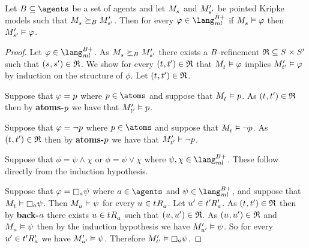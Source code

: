 \begin{proposition}\label{refinements-preserve-positive}
Let $\agentsB \subseteq \agents$ be a set of agents and let $\kPModel{\kStateS}$ and ${M^{\prime}_{{s}^{\prime}}}$ be pointed Kripke models such that $\kPModel{\kStateS} \simulatesBs \kPModelP{\kStateSP}$.
Then for every $\phi \in \langMlPlusBs$
if $\kPModel{\kStateS} \entails \phi$ then ${M^{\prime}_{{s}^{\prime}}} \vDash \varphi$.
\end{proposition}

\begin{proof}
Let $\phi \in \langMlPlusBs$.
As $\kPModel{\kStateS} \simulatesBs \kPModelP{\kStateSP}$ there exists a $B$-refinement $\refinement \subseteq \kStates \times \kStatesP$ such that $(\kStateS, \kStateSP) \in \refinement$.
We show for every $(\kStateT, \kStateTP) \in \refinement$ that $\kPModel{\kStateT} \entails \phi$ implies ${M^{\prime}_{{t}^{\prime}}} \vDash \varphi$ by induction on the structure of $\phi$.
Let $(\kStateT, \kStateTP) \in \refinement$.

Suppose that $\varphi = p$ where $\atomP \in \atoms$ and suppose that $\kPModel{\kStateT} \entails \atomP$.
As $(\kStateT, \kStateTP) \in \refinement$ then by {\bf atoms-$p$} we have that ${M^{\prime}_{{t}^{\prime}}} \vDash p$.

Suppose that $\varphi = \lnot p$ where $\atomP \in \atoms$ and suppose that $\kPModel{\kStateT} \entails \lnot \atomP$.
As $(\kStateT, \kStateTP) \in \refinement$ then by {\bf atoms-$p$} we have that ${M^{\prime}_{{t}^{\prime}}} \vDash \lnot p$.

Suppose that $\phi = \psi \land \chi$ or $\phi = \psi \lor \chi$ where $\psi, \chi \in \langMlPlusBs$.
These follow directly from the induction hypothesis.

Suppose that $\phi = \necessaryA \psi$ where $\agentA \in \agents$ and $\psi \in \langMlPlusBs$, and suppose that $\kPModel{\kStateT} \entails \necessaryA \psi$.
Then $\kPModel{\kStateU} \entails \psi$ for every $\kStateU \in \kSuccessorsA{\kStateT}$.
Let ${u}^{\prime} \in {{t}^{\prime}} {R^{\prime}_{a}}$.
As $(\kStateT, \kStateTP) \in \refinement$ then by {\bf back-$a$} there exists $\kStateU \in \kSuccessorsA{\kStateT}$ such that $(\kStateU, \kStateUP) \in \refinement$.
As $(\kStateU, \kStateUP) \in \refinement$ and $\kPModel{\kStateU} \entails \psi$ then by the induction hypothesis we have ${M^{\prime}_{{u}^{\prime}}} \vDash \psi$.
So for every ${u}^{\prime} \in {{t}^{\prime}} {R^{\prime}_{a}}$ we have ${M^{\prime}_{{u}^{\prime}}} \vDash \psi$.
Therefore $\kPModelP{\kStateTP} \entails \necessaryA \psi$.


\end{proof}
